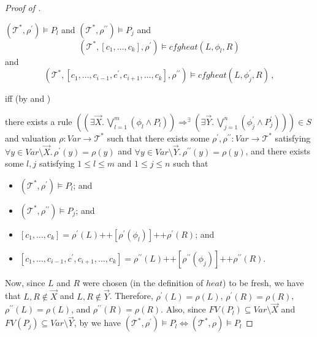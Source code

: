 \documentclass{article}
\newenvironment{proofenv}
  {
    \VerbatimEnvironment\begin{tcolorbox}[colback=black!0!white] %
  }
  {
   \end{tcolorbox}
  }
\begin{document}
\begin{proof}[Proof of ]
\begin{proofenv}
$(\mathcal{T}^*, \rho^\prime) \vDash P_l$ and $(\mathcal{T}^*, \rho^{\prime\prime}) \vDash P_j$ and
\begin{equation*}
    (\mathcal{T}^*, [c_1,\ldots,c_k], \rho^\prime) \vDash \mathit{cfgheat}(L, \phi_l, R)
\end{equation*}
and
\begin{equation*}
    (\mathcal{T}^*, [c_1, \ldots, c_{i-1}, c^\prime, c_{i+1}, \ldots, c_k], \rho^{\prime\prime}) \vDash
    \mathit{cfgheat}(L, \phi^\prime_j, R) \, ,
\end{equation*}
\end{proofenv}
iff (by  and )
\begin{proofenv}
there exists a rule $((\exists \vec{X}.\, \bigvee_{l=1}^{m} (\phi_l \land P_l)) \Rightarrow^\exists (\exists \vec{Y}.\, \bigvee_{j=1}^{n} (\phi^\prime_j \land P^\prime_j))) \in S$
and valuation $\rho : \mathit{Var} \to \mathcal{T}^*$ such that
there exists some $\rho^\prime,\rho^{\prime\prime} : \mathit{Var} \to \mathcal{T}^*$
satisfying $\forall y \in \mathit{Var} \setminus \vec{X}.\, \rho^\prime(y) = \rho(y)$
and $\forall y \in \mathit{Var} \setminus \vec{Y}.\, \rho^{\prime\prime}(y) = \rho(y)$,
and there exists some $l,j$ satisfying $1 \leq l \leq m$ and $1 \leq j \leq n$ such that
\begin{itemize}
    \item $(\mathcal{T}^*, \rho^\prime) \vDash P_l$; and
    \item $(\mathcal{T}^*, \rho^{\prime\prime}) \vDash P_j$; and
    \item $[c_1,\ldots,c_k] = \rho^\prime(L) \texttt{++} [\rho^\prime(\phi_l)] \texttt{++} \rho^\prime(R)$; and
    \item $[c_1, \ldots, c_{i-1}, c^\prime, c_{i+1}, \ldots, c_k] = \rho^{\prime\prime}(L)
    \texttt{++} [\rho^{\prime\prime}(\phi_j)] \texttt{++} \rho^{\prime\prime}(R)$.
\end{itemize}
\end{proofenv}
Now, since $L$ and $R$ were chosen (in the definition of $\mathit{heat}$) to be fresh, we have that
$L,R \not\in \vec{X}$ and $L,R \not\in \vec{Y}$. Therefore,
$\rho^\prime(L) = \rho(L)$, $\rho^\prime(R) = \rho(R)$,
$\rho^{\prime\prime}(L) = \rho(L)$, and $\rho^{\prime\prime}(R) = \rho(R)$.
Also, since $\mathit{FV}(P_l) \subseteq \mathit{Var} \setminus \vec{X}$
and $\mathit{FV}(P_j) \subseteq \mathit{Var} \setminus \vec{Y}$,
by  we have $(\mathcal{T}^*, \rho^\prime) \vDash P_l \iff (\mathcal{T}^*, \rho) \vDash P_l$

\end{proof}
\end{document}
